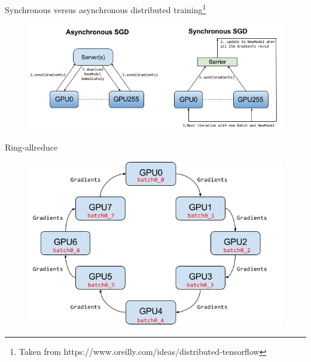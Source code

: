\documentclass{beamer}
\begin{document}
\begin{frame}[t]{Synchronous versus asynchronous distributed training\footnote{Taken from https://www.oreilly.com/ideas/distributed-tensorflow}}
  \begin{figure}[htpb]
    \centering
    \includegraphics[width=0.8\linewidth]{figure/async_versus_synv.png}
  \end{figure}
\end{frame}

\begin{frame}[t]{Ring-allreduce}
  \begin{figure}[htpb]
    \centering
    \includegraphics[width=0.8\linewidth]{figure/ring_reduce.png}
  \end{figure}
\end{frame}
\end{document}
